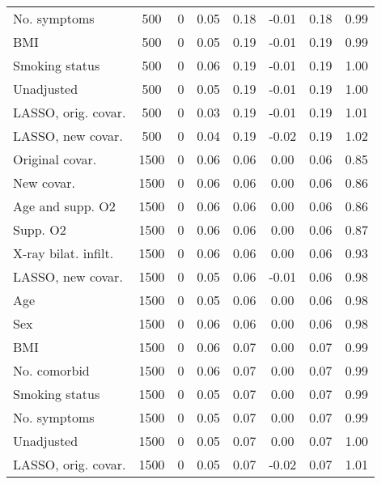 \documentclass{article}
\begin{document}
\begin{table}[htpb]
{\begin{tabular}{lccccccc}
No. symptoms & 500 & 0 & 0.05 & 0.18 & -0.01 & 0.18 & 0.99\\
BMI & 500 & 0 & 0.05 & 0.19 & -0.01 & 0.19 & 0.99\\
Smoking status & 500 & 0 & 0.06 & 0.19 & -0.01 & 0.19 & 1.00\\
Unadjusted & 500 & 0 & 0.05 & 0.19 & -0.01 & 0.19 & 1.00\\
LASSO, orig. covar. & 500 & 0 & 0.03 & 0.19 & -0.01 & 0.19 & 1.01\\
LASSO, new covar. & 500 & 0 & 0.04 & 0.19 & -0.02 & 0.19 & 1.02\\ \midrule
Original covar. & 1500 & 0 & 0.06 & 0.06 & 0.00 & 0.06 & 0.85\\
New covar. & 1500 & 0 & 0.06 & 0.06 & 0.00 & 0.06 & 0.86\\
Age and supp. O2 & 1500 & 0 & 0.06 & 0.06 & 0.00 & 0.06 & 0.86\\
Supp. O2 & 1500 & 0 & 0.06 & 0.06 & 0.00 & 0.06 & 0.87\\
X-ray bilat. infilt. & 1500 & 0 & 0.06 & 0.06 & 0.00 & 0.06 & 0.93\\
LASSO, new covar. & 1500 & 0 & 0.05 & 0.06 & -0.01 & 0.06 & 0.98\\
Age & 1500 & 0 & 0.05 & 0.06 & 0.00 & 0.06 & 0.98\\
Sex & 1500 & 0 & 0.06 & 0.06 & 0.00 & 0.06 & 0.98\\
BMI & 1500 & 0 & 0.06 & 0.07 & 0.00 & 0.07 & 0.99\\
No. comorbid & 1500 & 0 & 0.06 & 0.07 & 0.00 & 0.07 & 0.99\\
Smoking status & 1500 & 0 & 0.05 & 0.07 & 0.00 & 0.07 & 0.99\\
No. symptoms & 1500 & 0 & 0.05 & 0.07 & 0.00 & 0.07 & 0.99\\
Unadjusted & 1500 & 0 & 0.05 & 0.07 & 0.00 & 0.07 & 1.00\\
LASSO, orig. covar. & 1500 & 0 & 0.05 & 0.07 & -0.02 & 0.07 & 1.01\\ \bottomrule
\hline
\end{tabular}}
\end{table}
\end{document}
